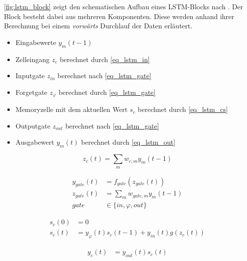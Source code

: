 \autoref{fig:lstm_block} zeigt den schematischen Aufbau eines \ac{LSTM}-Blocks
nach \cite{Gers2002b}. Der Block besteht dabei aus mehreren Komponenten. Diese
werden anhand ihrer Berechnung bei einem \textit{vorwärts} Durchlauf der Daten
erläutert.
\begin{itemize}
	\item Eingabewerte $y_m(t-1)$
	\item Zelleingang $z_c$ berechnet durch \autoref{eq_lstm_in}
	\item Inputgate $z_{in}$ berechnet nach \autoref{eq_lstm_gate}
	\item Forgetgate $z_\varphi$ berechnet durch \autoref{eq_lstm_gate}
	\item Memoryzelle mit dem aktuellen Wert $s_c$ berechnet durch
	\autoref{eq_lstm_cs}
	\item Outputgate $z_{out}$ berechnet nach \autoref{eq_lstm_gate}
	\item Ausgabewert $y_m(t)$ berechnet durch \autoref{eq_lstm_out}
\end{itemize}

\begin{equation}
\label{eq_lstm_in}
z_{c}(t) = \sum \limits_{m} w_{c,m}y_m(t-1)
\end{equation}

\begin{equation}
\label{eq_lstm_gate}
\begin{split}
y_{gate}(t) &= f_{gate}(z_{gate}(t))\\
z_{gate}(t) &= \sum \limits_{m} w_{gate,m}y_m(t-1)\\
gate &\in \{in,\varphi,out\}
\end{split}
\end{equation}

\begin{equation}
\label{eq_lstm_cs}
\begin{split}
s_{c}(0) &= 0\\
s_{c}(t) &= y_{\varphi}(t)s_{c}(t-1) +
y_{in}(t)g(z_{c}(t))
\end{split}
\end{equation}

\begin{equation}
\label{eq_lstm_out}
\begin{split}
y_{c}(t) &= y_{out}(t)s_{c}(t)\\
\end{split}
\end{equation}

